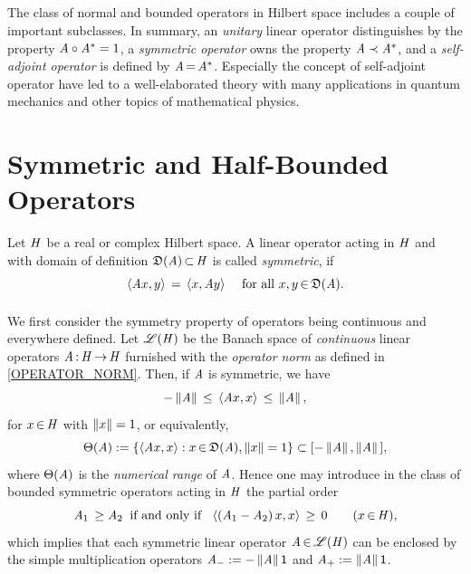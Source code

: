 \documentclass[11pt,twoside]{article}
\begin{document}
\subparagraph*{}
The class of normal and bounded operators in Hilbert space
includes a couple of important subclasses.
In summary,
an \textit{unitary} linear operator distinguishes 
by the property $\mathit{A} \circ \mathit{A}^* =1$,
a \textit{symmetric operator} owns the property $\mathit{A} \prec \mathit{A}^*$,
and a \textit{self-adjoint operator} is defined by $\mathit{A} {\,=\,} \mathit{A}^*$.
Especially the concept of self-adjoint operator have led
to a well-elaborated theory with many applications in quantum mechanics
and other topics of mathematical physics.

\section{Symmetric and Half-Bounded Operators}
Let $\mathit{H}$ be a real or complex Hilbert space.
A linear operator acting in $\mathit{H}$ and with domain of definition
$\mathfrak{D}(\mathit{A}) {\,\subset\,} \mathit{H}$ is called \textit{symmetric}, if
\begin{equation}\label{SYMMETRY_PROPERTY}
\langle \mathit{A} x,y \rangle \,=\, \langle x,\mathit{A} y \rangle \quad \mbox{ for all } x,y {\,\in\,} \mathfrak{D}(\mathit{A}).
\end{equation}

\paragraph*{}
We first consider the symmetry property of operators 
being continuous and everywhere defined.
Let $\mathscr{L}(\mathit{H})$ be the Banach space of \textit{continuous} linear operators
$\mathit{A} {\,:\,} \mathit{H} {\,\to\,} \mathit{H}$ furnished with the \textit{operator norm}
as defined in \eqref{OPERATOR_NORM}.
Then, if $\mathit{A}$ is symmetric,
we have
\[
- \left\lVert \mathit{A} \right\rVert \, \leq \, \langle \mathit{A} x,x \rangle \, \leq \, \left\lVert \mathit{A} \right\rVert,
\]
for $x {\,\in\,} \mathit{H}$ with $\left\lVert x \right\rVert=1$,
or equivalently,
\[
\Theta(\mathit{A}) :=
\{\langle \mathit{A} x,x \rangle: x {\,\in\,} \mathfrak{D}(\mathit{A}), \left\lVert x \right\rVert=1\}
\subset [-\left\lVert \mathit{A} \right\rVert, \left\lVert \mathit{A} \right\rVert\,],
\]
where $\Theta(\mathit{A})$ is the \textit{numerical range} of $\mathit{A}$.
Hence one may introduce in the class of bounded symmetric operators
acting in $\mathit{H}$ the partial order
\[
\mathit{A}_1 \, \geq \mathit{A}_2
\;\; \mbox{if and only if } \;\;
\langle (\mathit{A}_1 - \mathit{A}_2) \, x,x \rangle \, \geq \, 0
\quad \quad (x {\,\in\,} \mathit{H}),
\]
which implies that
each symmetric linear operator $\mathit{A} {\,\in\,} \mathscr{L}(\mathit{H})$ can be enclosed
by the simple multiplication operators $\mathit{A}_{-} := - \left\lVert \mathit{A} \right\rVert {\mathsf{1}}$
and $\mathit{A}_+ := \left\lVert \mathit{A} \right\rVert {\mathsf{1}}$.
\end{document}
